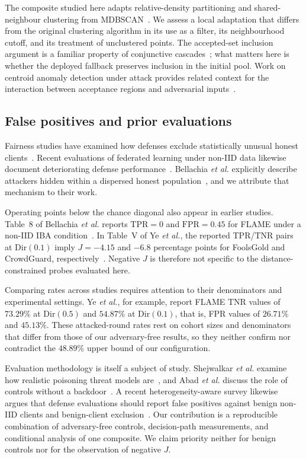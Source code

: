 \documentclass[journal]{IEEEtran}
\begin{document}
The composite studied here adapts relative-density partitioning and shared-neighbour clustering from MDBSCAN~\cite{qian2024mdbscan}. We assess a local adaptation that differs from the original clustering algorithm in its use as a filter, its neighbourhood cutoff, and its treatment of unclustered points. The accepted-set inclusion argument is a familiar property of conjunctive cascades~\cite{viola2004cascade}; what matters here is whether the deployed fallback preserves inclusion in the initial pool. Work on centroid anomaly detection under attack provides related context for the interaction between acceptance regions and adversarial inputs~\cite{kloft2012centroid}.

\subsection{False positives and prior evaluations}
Fairness studies have examined how defenses exclude statistically unusual honest clients~\cite{singh2023fair,touat2023bias,ajibuwa2025fairness}. Recent evaluations of federated learning under non-IID data likewise document deteriorating defense performance~\cite{li2025heterogeneity,ye2025illusion,zhang2025flpoison}. Bellachia \emph{et al.} explicitly describe attackers hidden within a dispersed honest population~\cite{bellachia2026sok}, and we attribute that mechanism to their work.

Operating points below the chance diagonal also appear in earlier studies. Table~8 of Bellachia \emph{et al.} reports $\mathrm{TPR}=0$ and $\mathrm{FPR}=0.45$ for FLAME under a non-IID IBA condition~\cite{bellachia2026sok}. In Table~V of Ye \emph{et al.}, the reported TPR/TNR pairs at $\mathrm{Dir}(0.1)$ imply $J=-4.15$ and $-6.8$ percentage points for FoolsGold and CrowdGuard, respectively~\cite{ye2025illusion}. Negative $J$ is therefore not specific to the distance-constrained probes evaluated here.

Comparing rates across studies requires attention to their denominators and experimental settings. Ye \emph{et al.}, for example, report FLAME TNR values of $73.29\%$ at $\mathrm{Dir}(0.5)$ and $54.87\%$ at $\mathrm{Dir}(0.1)$, that is, FPR values of $26.71\%$ and $45.13\%$. These attacked-round rates rest on cohort sizes and denominators that differ from those of our adversary-free results, so they neither confirm nor contradict the $48.89\%$ upper bound of our configuration.

Evaluation methodology is itself a subject of study. Shejwalkar \emph{et al.} examine how realistic poisoning threat models are~\cite{shejwalkar2022drawing}, and Abad \emph{et al.} discuss the role of controls without a backdoor~\cite{abad2025evaluation}. A recent heterogeneity-aware survey likewise argues that defense evaluations should report false positives against benign non-IID clients and benign-client exclusion~\cite{djemaa2026heterogeneity}. Our contribution is a reproducible combination of adversary-free controls, decision-path measurements, and conditional analysis of one composite. We claim priority neither for benign controls nor for the observation of negative $J$.
\end{document}
